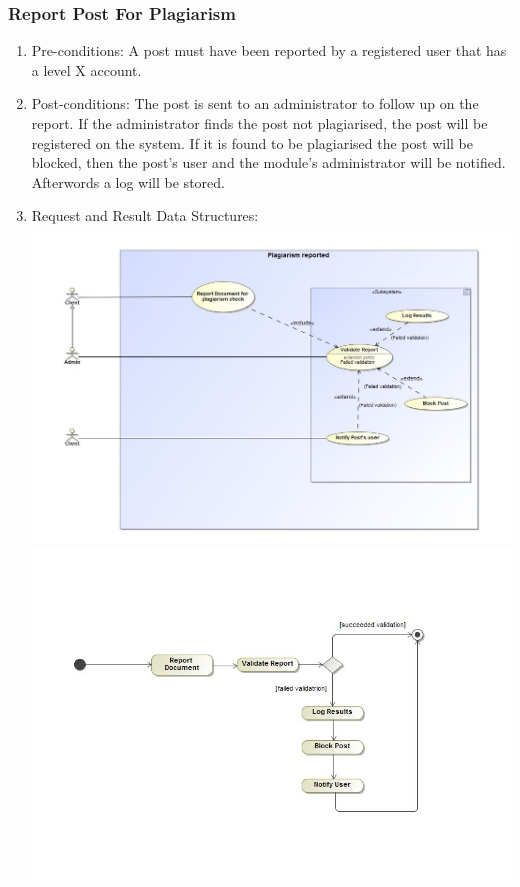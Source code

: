 \documentclass[12pt, oneside]{article}
\begin{document}
\subsubsection{Report Post For Plagiarism}
\begin{enumerate}
 \item Pre-conditions: A post must have been reported by a registered user that has a level X account. 
 \\
 
 \item Post-conditions: The post is sent to an administrator to follow up on the report. If the administrator finds the post not plagiarised, the post will be registered on the system. If it is found to be plagiarised the post will be blocked, then the post's user and the module's administrator will be notified. Afterwords a log will be stored. 
   \\
 \item Request and Result Data Structures:\\
  \includegraphics[scale=0.4]{plagiarismReportUC}\\
 \includegraphics[scale=0.35]{plagiarismReportAD} 
\end{enumerate}
\end{document}
